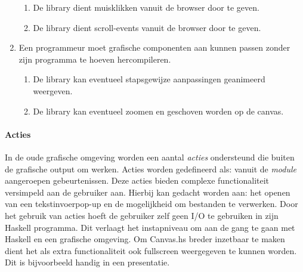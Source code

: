 \begin{enumerate}[label={R\arabic*}]
\begin{enumerate}[label={R\arabic{enumi}.\arabic*}]
		\item \label{req:event:mouse} De library dient muisklikken vanuit de browser door te geven.
		\item \label{req:event:scroll} De library dient scroll-events vanuit de browser door te geven.
	\end{enumerate}
	\item Een programmeur moet grafische componenten aan kunnen passen zonder zijn programma te hoeven hercompileren.
	\begin{enumerate}[label={R\arabic{enumi}.\arabic*}]
		\item \label{req:action:animate} De library kan eventueel stapsgewijze aanpassingen geanimeerd weergeven.
		\item \label{req:zoom} De library kan eventueel zoomen en geschoven worden op de canvas.
	\end{enumerate}
	\setcounter{startvalue}{\value{enumi}}
\end{enumerate}

\paragraph{Acties} In de oude grafische omgeving worden een aantal \emph{acties} ondersteund die buiten de grafische output om werken. Acties worden gedefineerd als: vanuit de \emph{module} aangeroepen gebeurtenissen. Deze acties bieden complexe functionaliteit versimpeld aan de gebruiker aan. Hierbij kan gedacht worden aan: het openen van een tekstinvoerpop-up en de mogelijkheid om bestanden te verwerken. Door het gebruik van acties hoeft de gebruiker zelf geen I/O te gebruiken in zijn Haskell programma. Dit verlaagt het instapniveau om aan de gang te gaan met Haskell en een grafische omgeving. Om Canvas.hs breder inzetbaar te maken dient het als extra functionaliteit ook fullscreen weergegeven te kunnen worden. Dit is bijvoorbeeld handig in een presentatie.

